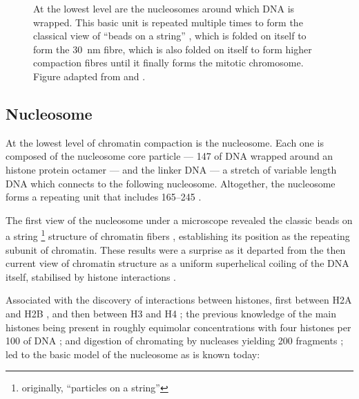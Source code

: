   \begin{figure}
    \centering
    \def\svgwidth{\textwidth}
                 {At the lowest level are the nucleosomes around which
                  DNA is wrapped.
                  This basic unit is repeated multiple times to form
                  the classical view of ``beads on a string''
                  ,
                  which is folded on itself to form the
                  \SI{30}{\nano\meter} fibre,
                  which is also folded on itself to form higher
                  compaction fibres until it finally forms the
                  mitotic chromosome.
                  Figure adapted from \cite{alberts} and \cite{lodish}.}
    \label{fig:intro:chromatin-structure}
  \end{figure}

  \subsection{Nucleosome}

    At the lowest level of chromatin compaction is the nucleosome.
    Each one is composed of the nucleosome core particle ---
    \SI{147}{\bp} of DNA wrapped around
    an histone protein octamer --- and the linker DNA ---
    a stretch of variable length DNA which connects
    to the following nucleosome.  Altogether, the nucleosome forms
    a repeating unit that includes \SIrange{165}{245}{\bp}
    \citep{widom1992-linker-length}.

    The first view of the nucleosome under a microscope revealed the
    classic beads on a string \footnote{originally, ``particles on a string''}
    structure of chromatin fibers
     \citep{olin1974-nu-bodies},
    establishing its position as the repeating subunit of chromatin.
    These results were a surprise as it departed from the then current view
    of chromatin structure as a uniform superhelical coiling of the
    DNA itself, stabilised by histone interactions
    \citep{pardon-wilkins-1972model}.

    Associated with the discovery of interactions between histones,
    first between H2A and H2B \citep{anna-isenberg-1974-h2a-h2b}, and
    then between H3 and H4 \citep{kornberg1974-results};
    the previous knowledge of the main histones being present in
    roughly equimolar concentrations with four histones per
    \SI{100}{\bp} of DNA ;
    and digestion of chromating by nucleases yielding
    \SI{200}{\bp} fragments \citep{hewish1973-200bp-pieces};
    led to the basic model of the nucleosome as is known today:

